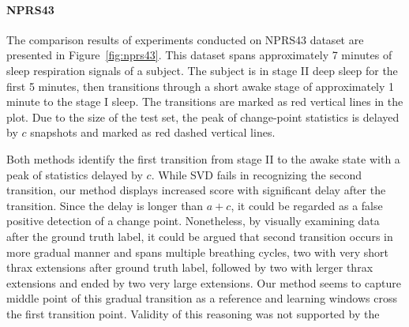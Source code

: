 \paragraph{NPRS43}
The comparison results of experiments conducted on NPRS43 dataset are presented in Figure~\ref{fig:nprs43}. This dataset spans approximately 7 minutes of sleep respiration signals of a subject. The subject is in stage II deep sleep for the first 5 minutes, then transitions through a short awake stage of approximately 1 minute to the stage I sleep. The transitions are marked as red vertical lines in the plot. Due to the size of the test set, the peak of change-point statistics is delayed by \(c\) snapshots and marked as red dashed vertical lines.

Both methods identify the first transition from stage II to the awake state with a peak of statistics delayed by \(c\). While SVD fails in recognizing the second transition, our method displays increased score with significant delay after the transition. Since the delay is longer than \(a + c\), it could be regarded as a false positive detection of a change point. Nonetheless, by visually examining data after the ground truth label, it could be argued that second transition occurs in more gradual manner and spans multiple breathing cycles, two with very short thrax extensions after ground truth label, followed by two with lerger thrax extensions and ended by two very large extensions. Our method seems to capture middle point of this gradual transition as a reference and learning windows cross the first transition point. Validity of this reasoning was not supported by the

